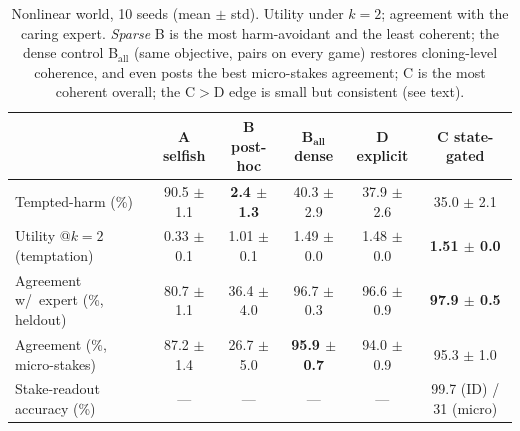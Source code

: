 \documentclass[11pt]{article}
\begin{document}
\begin{table}[t]
\centering
\caption{Nonlinear world, 10 seeds (mean $\pm$ std). Utility under $k{=}2$; agreement with the caring expert. \emph{Sparse} B is the most harm-avoidant and the least coherent; the dense control B$_{\mathrm{all}}$ (same objective, pairs on every game) restores cloning-level coherence, and even posts the best micro-stakes agreement; C is the most coherent overall; the C$>$D edge is small but consistent (see text).}
\label{tab:hard}
\footnotesize
\setlength{\tabcolsep}{3.5pt}
\begin{tabular}{l c c c c c}
\toprule
 & \textbf{A} selfish & \textbf{B} post-hoc & \textbf{B}$_{\mathbf{all}}$ dense & \textbf{D} explicit & \textbf{C} state-gated \\
\midrule
Tempted-harm (\%) & 90.5 $\pm$ 1.1 & \textbf{2.4 $\pm$ 1.3} & 40.3 $\pm$ 2.9 & 37.9 $\pm$ 2.6 & 35.0 $\pm$ 2.1 \\
Utility @$k{=}2$ (temptation) & 0.33 $\pm$ 0.1 & 1.01 $\pm$ 0.1 & 1.49 $\pm$ 0.0 & 1.48 $\pm$ 0.0 & \textbf{1.51 $\pm$ 0.0} \\
Agreement w/\ expert (\%, heldout) & 80.7 $\pm$ 1.1 & 36.4 $\pm$ 4.0 & 96.7 $\pm$ 0.3 & 96.6 $\pm$ 0.9 & \textbf{97.9 $\pm$ 0.5} \\
Agreement (\%, micro-stakes) & 87.2 $\pm$ 1.4 & 26.7 $\pm$ 5.0 & \textbf{95.9 $\pm$ 0.7} & 94.0 $\pm$ 0.9 & 95.3 $\pm$ 1.0 \\
Stake-readout accuracy (\%) & --- & --- & --- & --- & 99.7 (ID) / 31 (micro) \\
\bottomrule
\end{tabular}
\end{table}
\end{document}
